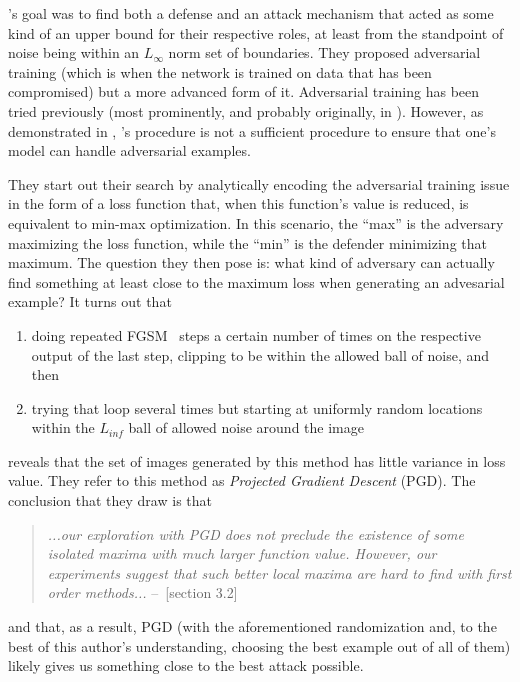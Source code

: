 \cite{madry2019deep}'s goal was to find both a defense and an attack mechanism that acted as some
kind of an upper bound for their respective roles, at least from the standpoint of noise being
within an $L_{\infty}$ norm set of boundaries. They proposed adversarial training (which is when the
network is trained on data that has been compromised) but a more advanced form of it. Adversarial
training has been tried previously (most prominently, and probably originally, in
\cite{goodfellow2015explaining}). However, as demonstrated in \cite{madry2019deep},
\cite{goodfellow2015explaining}'s procedure is not a sufficient procedure to ensure that one's model
can handle adversarial examples.

They start out their search by analytically encoding the adversarial training issue in the form of a
loss function that, when this function's value is reduced, is equivalent to min-max optimization.  In
this scenario, the ``max'' is the adversary maximizing the loss function, while the ``min'' is the
defender minimizing that maximum. The question they then pose is: what kind of adversary can
actually find something at least close to the maximum loss when generating an advesarial example? It
turns out that
\begin{enumerate}
    \item doing repeated FGSM~\cite{goodfellow2015explaining} steps a certain number of times on the
       respective output of the last step, clipping to be within the allowed ball of noise, and then
    \item trying that loop several times but starting at uniformly random locations within the $L_{inf}$
       ball of allowed noise around the image
\end{enumerate}
reveals that the set of images generated by this method has little variance in loss value. They
refer to this method as \textit{Projected Gradient Descent} (PGD). The conclusion that they draw is
that
\begin{quote}
    \textit{...our exploration with PGD does not preclude the existence of some
    isolated maxima with much larger function value. However, our experiments suggest that such
    better local maxima are hard to find with first order methods...}
    --~\cite{madry2019deep}[section 3.2]
\end{quote}
and that, as a result, PGD (with the aforementioned randomization and, to the best of this author's
understanding, choosing the best example out of all of them) likely gives us something close to the
best attack possible.

